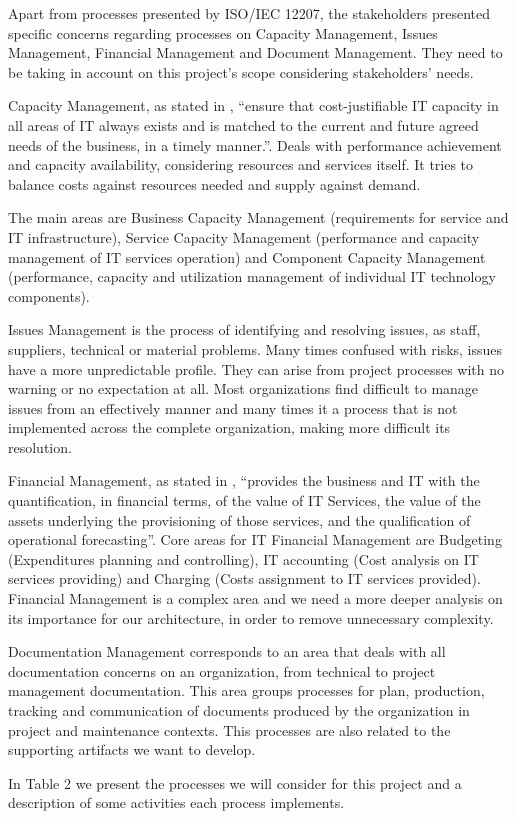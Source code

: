Apart from processes presented by ISO/IEC 12207, the stakeholders presented specific concerns regarding processes on Capacity Management, Issues Management, Financial Management and Document Management. They need to be taking in account on this project's scope considering stakeholders' needs.\par
Capacity Management, as stated in \cite{itilSD}, ``ensure that cost-justifiable IT capacity in all areas of IT always exists and is matched to the current and future agreed needs of the business, in a timely manner.''. Deals with performance achievement and capacity availability, considering resources and services itself. It tries to balance costs against resources needed and supply against demand.\par
The main areas are Business Capacity Management (requirements for service and IT infrastructure), Service Capacity Management (performance and capacity management of IT services operation) and Component Capacity Management (performance, capacity and utilization management of individual IT technology components).\par
Issues Management is the process of identifying and resolving issues, as staff, suppliers, technical or material problems. Many times confused with risks, issues have a more unpredictable profile. They can arise from project processes with no warning or no expectation at all. Most organizations find difficult to manage issues from an effectively manner and many times it a process that is not implemented across the complete organization, making more difficult its resolution.\par
Financial Management, as stated in \cite{itilSS}, ``provides the business and IT with the quantification, in financial terms, of the value of IT Services, the value of the assets underlying the provisioning of those services, and the qualification of operational forecasting''. Core areas for IT Financial Management are Budgeting (Expenditures planning and controlling), IT accounting (Cost analysis on IT services providing) and Charging (Costs assignment to IT services provided). Financial Management is a complex area and we need a more deeper analysis on its importance for our architecture, in order to remove unnecessary complexity.\par
Documentation Management corresponds to an area that deals with all documentation concerns on an organization, from technical to project management documentation. This area groups processes for plan, production, tracking and communication of documents produced by the organization in project and maintenance contexts. This processes are also related to the supporting artifacts we want to develop.\par
In Table 2 we present the processes we will consider for this project and a description of some activities each process implements.

